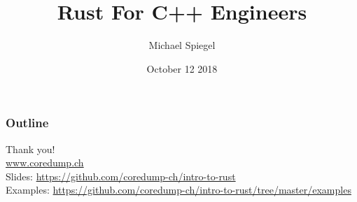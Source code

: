 \documentclass[aspectratio=1610,t]{beamer}
\title{Rust For C++ Engineers}
\date{October 12 2018}
\author{Michael Spiegel}
\begin{document}
\maketitle


\begin{frame}
	\frametitle{Outline}
	\setcounter{tocdepth}{1}
	\tableofcontents
\end{frame}












{
\begin{frame}[standout]
	\begin{centering}
	{\Huge Thank you!}\\
	{\normalsize \url{www.coredump.ch}}\\
	{\footnotesize Slides: \url{https://github.com/coredump-ch/intro-to-rust}}\\
	{\footnotesize Examples: \url{https://github.com/coredump-ch/intro-to-rust/tree/master/examples}}\\
	\end{centering}
\end{frame}
}
\end{document}
